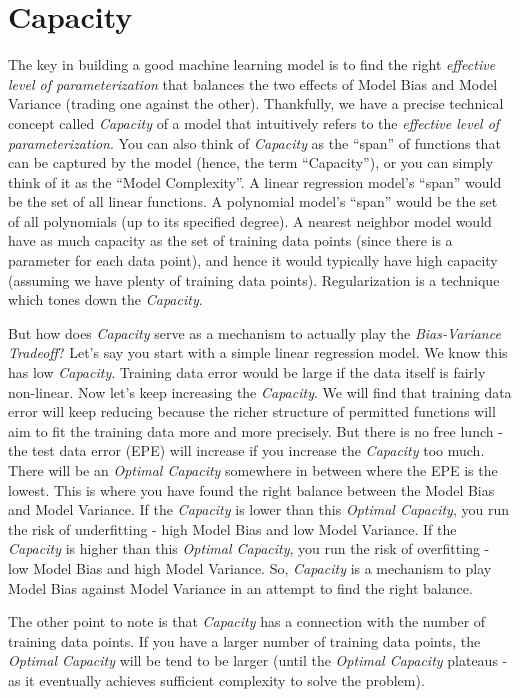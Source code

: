 \documentclass[11pt]{article}   	%
\begin{document}
\section{Capacity}
The key in building a good machine learning model is to find the right {\em effective level of parameterization} that balances the two effects of Model Bias and Model Variance (trading one against the other). Thankfully, we have a precise technical concept called {\em Capacity} of a model that intuitively refers to the {\em effective level of parameterization}. You can also think of {\em Capacity} as the ``span'' of functions that can be captured by the model (hence, the term ``Capacity''), or you can simply think of it as the ``Model Complexity''. A linear regression model's ``span'' would be the set of all linear functions. A polynomial model's ``span'' would be the set of all polynomials (up to its specified degree). A nearest neighbor model would have as much capacity as the set of training data points (since there is a parameter for each data point), and hence it would typically have high capacity (assuming we have plenty of training data points). Regularization is a technique which tones down the {\em Capacity}. 

But how does {\em Capacity} serve as a mechanism to actually play the {\em Bias-Variance Tradeoff}? Let's say you start with a simple linear regression model. We know this has low {\em Capacity}. Training data error would be large if the data itself is fairly non-linear. Now let's keep increasing the {\em Capacity}. We will find that training data error will keep reducing because the richer structure of permitted functions will aim to fit the training data more and more precisely. But there is no free lunch - the test data error (EPE) will increase if you increase the {\em Capacity} too much. There will be an {\em Optimal Capacity} somewhere in between where the EPE is the lowest. This is where you have found the right balance between the Model Bias and Model Variance. If the {\em Capacity} is lower than this {\em Optimal Capacity}, you run the risk of underfitting - high Model Bias and low Model Variance. If the {\em Capacity} is higher than this {\em Optimal Capacity}, you run the risk of overfitting - low Model Bias and high Model Variance. So, {\em Capacity} is a mechanism to play Model Bias against Model Variance in an attempt to find the right balance.

The other point to note is that {\em Capacity} has a connection with the number of training data points. If you have a larger number of training data points, the {\em Optimal Capacity} will be tend to be larger (until the {\em Optimal Capacity} plateaus - as it eventually achieves sufficient complexity to solve the problem).
\end{document}
